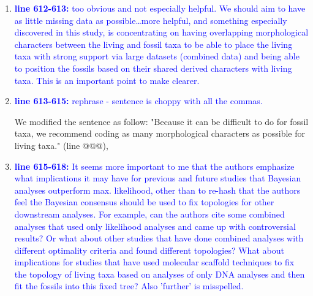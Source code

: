 \documentclass[12pt,letterpaper]{article}
\begin{document}
\begin{enumerate}
\item{\textcolor{blue}{\textbf{line 612-613:} too obvious and not especially helpful. We should aim to have as little missing data as possible…more helpful, and something especially discovered in this study, is concentrating on having overlapping morphological characters between the living and fossil taxa to be able to place the living taxa with strong support via large datasets (combined data) and being able to position the fossils based on their shared derived characters with living taxa. This is an important point to make clearer. }}


\item{\textcolor{blue}{\textbf{line 613-615:} rephrase - sentence is choppy with all the commas. }}

We modified the sentence as follow: "Because it can be difficult to do for fossil taxa, we recommend coding as many morphological characters as possible for living taxa." (line @@@),

\item{\textcolor{blue}{\textbf{line 615-618:} It seems more important to me that the authors emphasize what implications it may have for previous and future studies that Bayesian analyses outperform max. likelihood, other than to re-hash that the authors feel the Bayesian consensus should be used to fix topologies for other downstream analyses.
For example, can the authors cite some combined analyses that used only likelihood analyses and came up with controversial results?
Or what about other studies that have done combined analyses with different optimality criteria and found different topologies?
What about implications for studies that have used molecular scaffold techniques to fix the topology of living taxa based on analyses of only DNA analyses and then fit the fossils into this fixed tree?
Also 'further' is misspelled.  }}


\end{enumerate}
\end{document}
